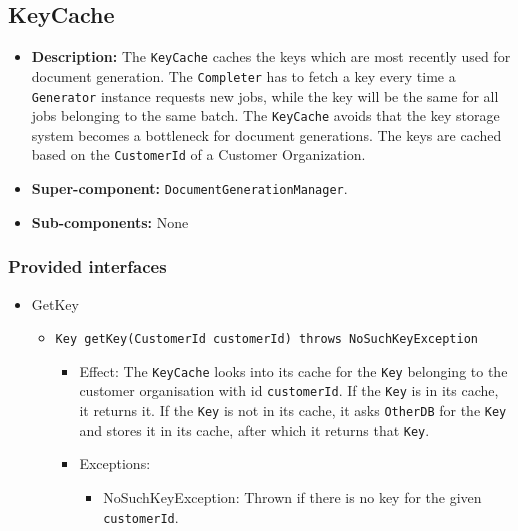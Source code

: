 \documentclass[a4paper,10pt]{article}
\begin{document}
\subsection{KeyCache}
\begin{itemize}
    \item \textbf{Description:} The \texttt{KeyCache} caches the keys which are most recently used for document generation. The \texttt{Completer} has to fetch a key every time a \texttt{Generator} instance requests new jobs, while the key will be the same for all jobs belonging to the same batch. The \texttt{KeyCache} avoids that the key storage system becomes a bottleneck for document generations. The keys are cached based on the \texttt{CustomerId} of a Customer Organization.
    \item \textbf{Super-component:}  \texttt{DocumentGenerationManager}.
    \item \textbf{Sub-components:} None
\end{itemize}

\subsubsection*{Provided interfaces}
\begin{itemize}
    \item GetKey
    \begin{itemize}
        \item \texttt{Key getKey(CustomerId customerId) throws NoSuchKeyException}
        \begin{itemize}
            \item Effect: The \texttt{KeyCache} looks into its cache for the \texttt{Key} belonging to the customer organisation with id \texttt{customerId}. If the \texttt{Key} is in its cache, it returns it. If the \texttt{Key} is not in its cache, it asks \texttt{OtherDB} for the \texttt{Key} and stores it in its cache, after which it returns that \texttt{Key}.
            \item Exceptions:
            \begin{itemize}
                \item NoSuchKeyException: Thrown if there is no key for the given \texttt{customerId}.
            \end{itemize}
        \end{itemize}
    \end{itemize}
\end{itemize}
\end{document}
